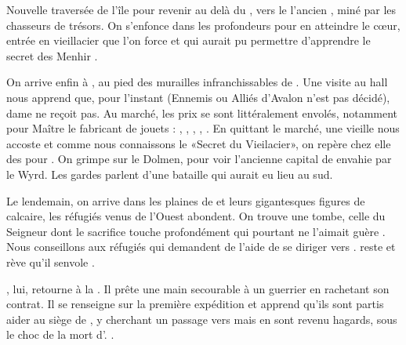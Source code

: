 \documentclass[11pt]{article}
\begin{document}
Nouvelle traversée de l'île pour revenir au delà du \bosquet{}, vers le l'ancien \tumulus{} , miné par les chasseurs de trésors. On s'enfonce dans les profondeurs pour en atteindre le c\oe{}ur, entrée en vieillacier que l'on force et qui aurait pu permettre d'apprendre le secret des Menhir \gain{\magic[1]}.

On arrive enfin à \loincomtat{} , au pied des murailles infranchissables de \tuathan{}. Une visite au hall nous apprend que, pour l'instant (Ennemis ou Alliés d'Avalon n'est pas décidé), dame \kincaid{} ne reçoit pas. Au marché, les prix se sont littéralement envolés, notamment pour Maître \dobromir{} le fabricant de jouets : , , , , . En quittant le marché, une vieille nous accoste et comme nous connaissons le «Secret du Vieilacier», on repère chez elle des \gain{\outilspierre} pour \rich[2]. On grimpe sur le Dolmen, pour voir l'ancienne capital de \tuathan{} envahie par le Wyrd. Les gardes parlent d'une bataille qui aurait eu lieu au sud.


Le lendemain, on arrive dans les plaines de \debacle{}  et leurs gigantesques figures de calcaire, les réfugiés venus de l'Ouest abondent. On trouve une tombe, celle du Seigneur \yvain{} dont le sacrifice touche profondément \larve{} qui pourtant ne l'aimait guère . Nous conseillons aux réfugiés qui demandent de l'aide de se diriger vers \newcamelot{} . \larve{} reste et rève qu'il senvole \gain{\nrj[1]}.

\beor{}, lui,  retourne à la \foire{}. Il prête une main secourable  à un guerrier en rachetant son contrat. Il se renseigne sur la première expédition et apprend qu'ils sont partis aider au siège de \boismuraille{}, y cherchant un passage vers \tuathan{} mais en sont revenu hagards, sous le choc de la mort d'\yvain{}. .

\end{document}
